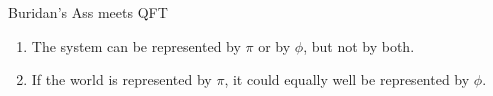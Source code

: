 \documentclass{beamer}
\begin{document}























\begin{frame}{Buridan's Ass meets QFT}

\begin{enumerate}
\item The system can be represented by $\pi$ or by $\phi$, but not by
  both.
\item If the world is represented by $\pi$, it could equally well be
  represented by $\phi$.
\end{enumerate}

\end{frame}
\end{document}
